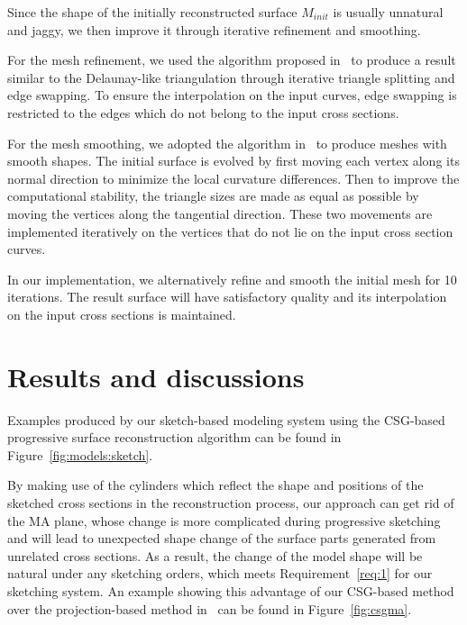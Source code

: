 Since the shape of the initially reconstructed surface $M_{init}$ is usually unnatural and jaggy, we then improve it through iterative refinement and smoothing.

For the mesh refinement, we used the algorithm proposed in~\cite{LP03} to produce a result similar to the Delaunay-like triangulation through iterative triangle splitting and edge swapping. To ensure the interpolation on the input curves, edge swapping is restricted to the edges which do not belong to the input cross sections.

For the mesh smoothing, we adopted the algorithm in~\cite{YB02} to produce meshes with smooth shapes. The initial surface is evolved by first moving each vertex along its normal direction to minimize the local curvature differences. Then to improve the computational stability, the triangle sizes are made as equal as possible by moving the vertices along the tangential direction. These two movements are implemented iteratively on the vertices that do not lie on the input cross section curves.

In our implementation, we alternatively refine and smooth the initial mesh for 10 iterations. The result surface will have satisfactory quality and its interpolation on the input cross sections is maintained.


\section{Results and discussions}
\label{ch4:sec:disc}

Examples produced by our sketch-based modeling  system using the
CSG-based progressive surface reconstruction algorithm can be found
in Figure~\ref{fig:models:sketch}.

By making use of the cylinders which reflect the shape and
positions of the sketched cross sections in the reconstruction
process, our approach can get rid of the MA plane, whose change is
more complicated during progressive sketching and will lead to
unexpected shape change of the surface parts generated from
unrelated cross sections. As a result, the change of the model shape
will be natural under any sketching orders, which meets
Requirement~\ref{req:1} for our sketching system. An example showing
this advantage of our CSG-based method over the projection-based
method in~\cite{LBDLJ08} can be found in Figure~\ref{fig:csgma}.

